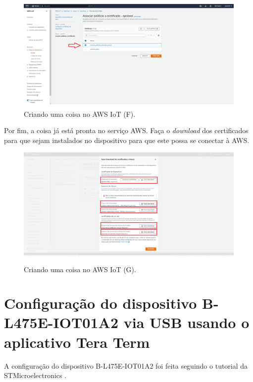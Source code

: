 \begin{figure}[H]
    \centering
    \caption{Criando uma coisa no AWS IoT (F).}
    \includegraphics[scale=0.315]{Imagens/criando_uma_coisa_no_aws_iot_5.png}
\end{figure}

Por fim, a coisa já está pronta no serviço AWS. Faça o \textit{download} dos certificados para que sejam instalados no dispositivo para que este possa se conectar à AWS.

\begin{figure}[H]
    \centering
    \caption{Criando uma coisa no AWS IoT (G).}
    \includegraphics[scale=0.315]{Imagens/criando_uma_coisa_no_aws_iot_6.png}
    \label{fig:criacao_de_uma_coisa_no_aws_iot_g}
\end{figure}

\section{Configuração do dispositivo B-L475E-IOT01A2 via USB usando o aplicativo Tera Term}\label{section:configuracao_dispositivo_bl475eiot01a2_via_usb}

A configuração do dispositivo B-L475E-IOT01A2 foi feita seguindo o tutorial da STMicroelectronics \cite{ref:041}.

